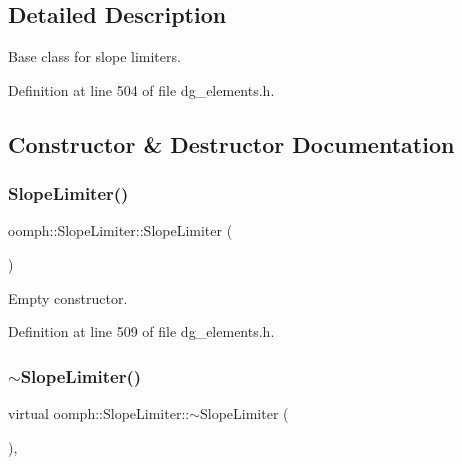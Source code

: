 \subsection{Detailed Description}
Base class for slope limiters. 

Definition at line 504 of file dg\+\_\+elements.\+h.



\subsection{Constructor \& Destructor Documentation}
\mbox{\label{classoomph_1_1SlopeLimiter_a9ea7a03f4b5992b7c4a3d324c01fa257}} 
\subsubsection{\texorpdfstring{Slope\+Limiter()}{SlopeLimiter()}}
{\footnotesize\ttfamily oomph\+::\+Slope\+Limiter\+::\+Slope\+Limiter (\begin{DoxyParamCaption}{ }\end{DoxyParamCaption})\hspace{0.3cm}{\ttfamily [inline]}}



Empty constructor. 



Definition at line 509 of file dg\+\_\+elements.\+h.

\mbox{\label{classoomph_1_1SlopeLimiter_a40f42cee7a9bdfa71f200d230dc66008}} 
\subsubsection{\texorpdfstring{$\sim$\+Slope\+Limiter()}{~SlopeLimiter()}}
{\footnotesize\ttfamily virtual oomph\+::\+Slope\+Limiter\+::$\sim$\+Slope\+Limiter (\begin{DoxyParamCaption}{ }\end{DoxyParamCaption})\hspace{0.3cm}{\ttfamily [inline]}, {\ttfamily [virtual]}}



